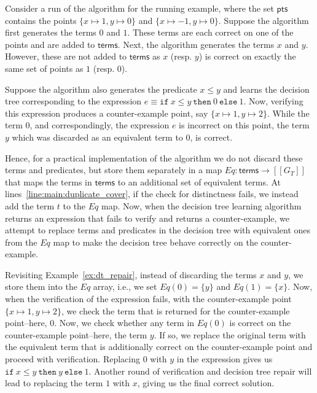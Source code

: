 \documentclass{llncs}
\newcommand\Equiv{\mathit{Eq}}
\newcommand\Points{\mathsf{pts}}
\newcommand\Expr{e}
\newcommand\Terms{\mathsf{terms}}
\newcommand\Term{t}
\newcommand\Grammar{G}
\newcommand\sem[1]{[\![ #1 ]\!]}
\begin{document}
\begin{example}
  \label{ex:dt_repair}
  Consider a run of the algorithm for the running
  example, where the set $\Points$ contains the points $\{ x \mapsto 1,
  y \mapsto 0 \}$ and $\{ x \mapsto -1, y \mapsto 0 \}$.
  Suppose the algorithm first generates the terms $0$ and $1$.
  These terms are each correct on one of the points and are added to
  $\Terms$.
  Next, the algorithm generates the terms $x$ and $y$.
  However, these are not added to $\Terms$ as $x$ (resp. $y$) is correct
  on exactly the same set of points as $1$ (resp. $0$).

  Suppose the algorithm also generates the predicate $x \leq y$ and
  learns the decision tree corresponding to the expression $\Expr \equiv
  \mathtt{if}~x \leq y~\mathtt{then}~0~\mathtt{else}~1$.
  Now, verifying this expression produces a counter-example point, say
  $\{ x \mapsto 1, y \mapsto 2 \}$.
  While the term $0$, and correspondingly, the expression $\Expr$ is
  incorrect on this point, the term $y$ which was discarded as an
  equivalent term to $0$, is correct.
\end{example}

Hence, for a practical implementation of the algorithm we do not discard
these terms and predicates, but store them separately in a map $\Equiv :
\Terms \to \sem{\Grammar_T}$ that maps the terms in
$\Terms$ to an additional set of equivalent terms.
At lines~\ref{line:main:duplicate_cover}, if the check for distinctness
fails, we instead add the term $\Term$ to the $\Equiv$ map.
Now, when the decision tree learning algorithm returns an expression
that fails to verify and returns a counter-example, we attempt to
replace terms and predicates in the decision tree with equivalent ones
from the $\Equiv$ map to make the decision tree behave correctly on the
counter-example.

\begin{example}
  Revisiting Example~\ref{ex:dt_repair}, instead of discarding the terms
  $x$ and $y$, we store them into the $\Equiv$ array, i.e., we set
  $\Equiv(0) = \{ y \}$ and $\Equiv(1) = \{ x \}$.
  Now, when the verification of the expression fails, with the
  counter-example point $\{ x \mapsto 1, y \mapsto 2 \}$, we check the
  term that is returned for the counter-example point--here, $0$.
  Now, we check whether any term in $\Equiv(0)$ is correct on the
  counter-example point--here, the term $y$.
  If so, we replace the original term with the equivalent term that is
  additionally correct on the counter-example point and proceed with
  verification.
  Replacing $0$ with $y$ in the expression gives us $\mathtt{if}~x \leq
  y~\mathtt{then}~y~\mathtt{else}~1$.
  Another round of verification and decision tree repair will lead to
  replacing the term $1$ with $x$, giving us the final correct solution.
\end{example}
\end{document}
